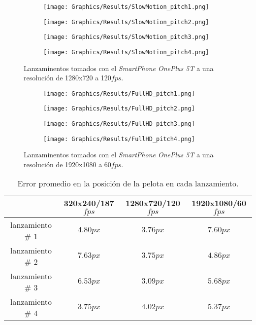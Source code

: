 \begin{figure}[!h]
    \centering
    \begin{subfigure}[b]{0.48\linewidth}
        \texttt{[image: Graphics/Results/SlowMotion\_pitch1.png]}
    \end{subfigure}
    \begin{subfigure}[b]{0.48\linewidth}
        \texttt{[image: Graphics/Results/SlowMotion\_pitch2.png]}
    \end{subfigure}
    \begin{subfigure}[b]{0.48\linewidth}
        \texttt{[image: Graphics/Results/SlowMotion\_pitch3.png]}
    \end{subfigure}
    \begin{subfigure}[b]{0.48\linewidth}
        \texttt{[image: Graphics/Results/SlowMotion\_pitch4.png]}
    \end{subfigure}
	\caption{Lanzaminentos tomados con el \textit{SmartPhone OnePlus 5T} a una resolución de 1280x720 a 120$fps$.}
	\label{fig:PitchesSlowMotion}
\end{figure}

\begin{figure}[!h]
    \centering
    \begin{subfigure}[b]{0.48\linewidth}
        \texttt{[image: Graphics/Results/FullHD\_pitch1.png]}
    \end{subfigure}
    \begin{subfigure}[b]{0.48\linewidth}
        \texttt{[image: Graphics/Results/FullHD\_pitch2.png]}
    \end{subfigure}
    \begin{subfigure}[b]{0.48\linewidth}
        \texttt{[image: Graphics/Results/FullHD\_pitch3.png]}
    \end{subfigure}
    \begin{subfigure}[b]{0.48\linewidth}
        \texttt{[image: Graphics/Results/FullHD\_pitch4.png]}
    \end{subfigure}
	\caption{Lanzaminentos tomados con el \textit{SmartPhone OnePlus 5T} a una resolución de 1920x1080 a 60$fps$.}
	\label{fig:PitchesFullHD}
\end{figure}

\begin{table}[!h]
    \centering
    \begin{tabular}{cccc}
        & 320x240/187$fps$ & 1280x720/120$fps$ & 1920x1080/60$fps$\\\hline
        lanzamiento \# 1 & $4.80px$ & $3.76px$ & $7.60px$\\\hline
        lanzamiento \# 2 & $7.63px$ & $3.75px$ & $4.86px$\\\hline
        lanzamiento \# 3 & $6.53px$ & $3.09px$ & $5.68px$\\\hline
        lanzamiento \# 4 & $3.75px$ & $4.02px$ & $5.37px$
    \end{tabular}
    \caption{Error promedio en la posición de la pelota en cada lanzamiento.}
    \label{table:Errors}
\end{table}

